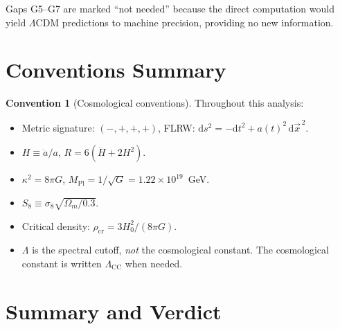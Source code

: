 \documentclass[11pt,a4paper]{article}
\theoremstyle{plain}
\theoremstyle{definition}
\newtheorem{convention}[theorem]{Convention}
\theoremstyle{remark}
\renewcommand{\dd}{\mathrm{d}}
\begin{document}
Gaps G5--G7 are marked ``not needed'' because the direct computation
would yield $\Lambda$CDM predictions to machine precision, providing
no new information.

\section{Conventions Summary}
\label{sec:conventions}

\begin{convention}[Cosmological conventions]\label{conv:cosmo}
Throughout this analysis:
\begin{itemize}[nosep]
  \item Metric signature: $(-,+,+,+)$, FLRW: $\dd s^2 = -\dd t^2 + a(t)^2\,\dd\vec{x}^{\,2}$.
  \item $H \equiv \dot{a}/a$, $R = 6(\dot{H} + 2H^2)$.
  \item $\kappa^2 = 8\pi G$, $M_{\mathrm{Pl}} = 1/\sqrt{G} = 1.22 \times 10^{19}$~GeV.
  \item $S_8 \equiv \sigma_8\sqrt{\Omega_m/0.3}$.
  \item Critical density: $\rho_{\mathrm{cr}} = 3H_0^2/(8\pi G)$.
  \item $\Lambda$ is the spectral cutoff, \emph{not} the cosmological constant.
    The cosmological constant is written $\Lambda_{\mathrm{CC}}$ when needed.
\end{itemize}
\end{convention}

\section{Summary and Verdict}
\label{sec:summary}
\end{document}
